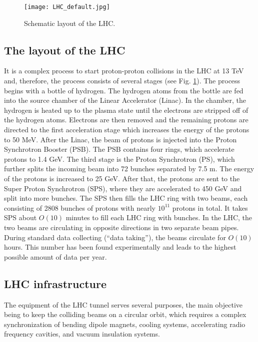 \begin{normalsize}
\begin{figure}[H]
  \centering
  \texttt{[image: LHC\_default.jpg]}
  \caption {Schematic layout of the LHC.}
  \label{lhcmap}
\end{figure}



\subsection{The layout of the LHC}

It is a complex process to start proton-proton collisions in the LHC at 13 TeV and, therefore, the process consists of several stages (see Fig. \ref{lhcmap}). The process begins with a bottle of hydrogen. The hydrogen atoms from the bottle are fed into the source chamber of the Linear Accelerator (Linac). In the chamber, the hydrogen is heated up to the plasma state until the electrons are stripped off of the hydrogen atoms. Electrons are then removed and the remaining protons are directed to the first acceleration stage which increases the energy of the protons to 50 MeV. After the Linac, the beam of protons is injected into the Proton Synchrotron Booster (PSB). The PSB contains four rings, which accelerate protons to 1.4 GeV. The third stage is the Proton Synchrotron (PS), which further splits the incoming beam into 72 bunches separated by 7.5 m. The energy of the protons is increased to 25 GeV. After that, the protons are sent to the Super Proton Synchrotron (SPS), where they are accelerated to 450 GeV and split into more bunches. The SPS then fills the LHC ring with two beams, each consisting of 2808 bunches of protons with nearly $10^{11}$ protons in total. It takes SPS about $O(10)$ minutes to fill each LHC ring with bunches. In the LHC, the two beams are circulating in opposite directions in two separate beam pipes. During standard data collecting (``data taking''), the beams circulate for $O(10)$ hours. This number has been found experimentally and leads to the highest possible amount of data per year.  

\subsection{LHC infrastructure}

The equipment of the LHC tunnel serves several purposes,  the main objective being to keep the colliding beams on a circular orbit, which requires a complex synchronization of bending dipole magnets, cooling systems, accelerating radio frequency cavities, and vacuum insulation systems.



\end{normalsize}
